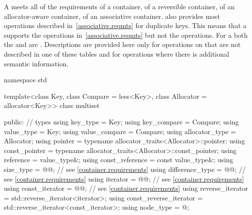 \pnum
A  meets all of the requirements
of a container,
of a reversible container,
of an allocator-aware container,
of an associative container.
also provides most operations described in~\ref{associative.reqmts}
for duplicate keys.
This means that a
supports the
operations in~\ref{associative.reqmts}
but not the
operations.
For a
both the
and
are
.
Descriptions are provided here only for operations on
that are not described in one of these tables
and for operations where there is additional semantic information.

\begin{codeblock}
namespace std {
  template<class Key, class Compare = less<Key>,
           class Allocator = allocator<Key>>
  class multiset {
  public:
    // types
    using key_type               = Key;
    using key_compare            = Compare;
    using value_type             = Key;
    using value_compare          = Compare;
    using allocator_type         = Allocator;
    using pointer                = typename allocator_traits<Allocator>::pointer;
    using const_pointer          = typename allocator_traits<Allocator>::const_pointer;
    using reference              = value_type&;
    using const_reference        = const value_type&;
    using size_type              = @@; // see \ref{container.requirements}
    using difference_type        = @@; // see \ref{container.requirements}
    using iterator               = @@; // see \ref{container.requirements}
    using const_iterator         = @@; // see \ref{container.requirements}
    using reverse_iterator       = std::reverse_iterator<iterator>;
    using const_reverse_iterator = std::reverse_iterator<const_iterator>;
    using node_type              = @\unspec@;

}}
\end{codeblock}
